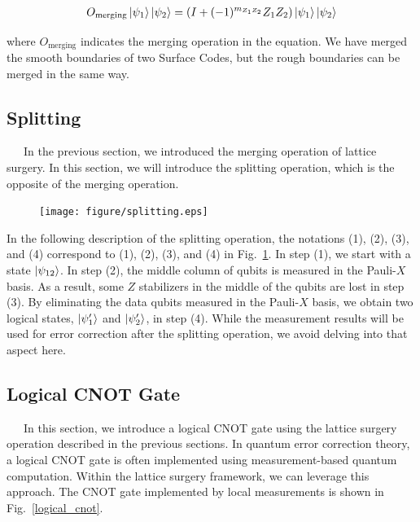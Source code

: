 \documentclass[a4paper,11pt]{ltjsarticle}
\begin{document}
{    \begin{align}
        O_\text{merging}\ket{\psi_1}\ket{\psi_2}=\left(I+(-1)^{m_{Z_1Z_2}}Z_1Z_2\right)\ket{\psi_1}\ket{\psi_2}
    \end{align}

    where $O_{\text{merging}}$ indicates the merging operation in the equation. We have merged the smooth boundaries of two Surface Codes, but the rough boundaries can be merged in the same way.

    \subsection{Splitting}{
        \ \ \ In the previous section, we introduced the merging operation of lattice surgery. In this section, we will introduce the splitting operation, which is the opposite of the merging operation.

        \begin{figure}[h]
            \centering
            \texttt{[image: figure/splitting.eps]}
            \vspace{0pt}\caption{}
            \label{splitting}
            \vspace{-10pt}
        \end{figure}

        In the following description of the splitting operation, the notations (1), (2), (3), and (4) correspond to (1), (2), (3), and (4) in Fig.~\ref{splitting}. In step (1), we start with a state $\ket{\psi_{12}}$. In step (2), the middle column of qubits is measured in the Pauli-$X$ basis. As a result, some $Z$ stabilizers in the middle of the qubits are lost in step (3). By eliminating the data qubits measured in the Pauli-$X$ basis, we obtain two logical states, $\ket{\psi'_1}$ and $\ket{\psi'_2}$, in step (4). While the measurement results will be used for error correction after the splitting operation, we avoid delving into that aspect here.
    }

    \subsection{Logical CNOT Gate}{
        \ \ \ In this section, we introduce a logical CNOT gate using the lattice surgery operation described in the previous sections. In quantum error correction theory, a logical CNOT gate is often implemented using measurement-based quantum computation. Within the lattice surgery framework, we can leverage this approach. The CNOT gate implemented by local measurements is shown in Fig.~\ref{logical_cnot}.
        \clearpage

}}
\end{document}
